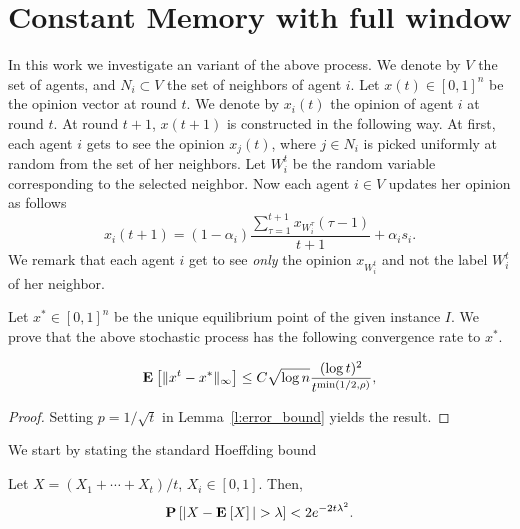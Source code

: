 \section{Constant Memory with full window}

In this work we investigate an variant of the above process.
We denote by $V$ the set of agents, and $N_{i} \subset V$ the set of neighbors
of agent $i$.
Let $x(t) \in [0,1]^n$ be the opinion vector at round $t$.
We denote by $x_i(t)$ the opinion of agent $i$ at round $t$.
At round $t+1$, $x(t+1)$ is constructed in the following way.
At first, each agent $i$ gets to see
the opinion $x_j(t)$, where $j \in N_i$ is picked uniformly at random
from the set of her neighbors.  Let $W_i^t$ be the random variable
corresponding to the selected neighbor. Now each agent $i \in V$
updates her opinion as follows
\[
  x_i(t+1) =
  (1-\alpha_i)\frac{\sum_{\tau=1}^{t+1} x_{W_i^\tau}(\tau-1)}{t+1}
  + \alpha_i s_i.
\]
We remark that each agent $i$ get to see \emph{only} the opinion
$x_{W_i^t}$ and not the label $W_i^t$ of her neighbor.

Let $x^* \in [0,1]^n$ be the unique equilibrium point
of the given instance $I$. We prove that
the above stochastic process has the following convergence
rate to $x^*$.
\begin{theorem}

  \[
    \bm{\mathrm{E}}_{} \left[ \| x^t - x^* \|_{\infty} \right] \leq
      C \sqrt{\log n}\frac{(\log t)^{2}}{t^{\min(1/2,\rho)}},
  \]
\end{theorem}
\begin{proof}
  Setting $p = 1/\sqrt{t}$ in Lemma~\ref{l:error_bound} yields
  the result.
\end{proof}

We start by stating the standard Hoeffding bound

\begin{lemma}\label{l:hoeffding}
  Let $X = (X_1 +\cdots + X_t) /t$, $X_i \in [0,1]$.
  Then,
  \[
    \Prob{|X - \Exp{X} | > \lambda} < 2 e^{-2 t \lambda^2}.
  \]
\end{lemma}

